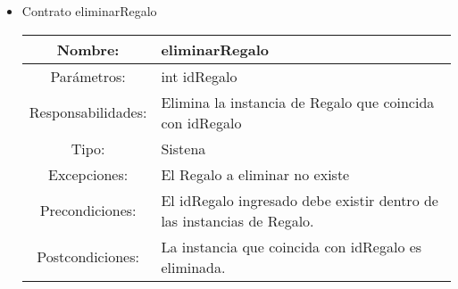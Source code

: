 \begin{itemize}
	\item Contrato eliminarRegalo \\
	\begin{tabular}{|c|p{10cm}|}\hline
		Nombre: & eliminarRegalo\\\hline	
		Par\'ametros: & int idRegalo\\\hline
		Responsabilidades: & Elimina la instancia de Regalo que coincida con idRegalo \\\hline
		Tipo: & Sistena \\\hline
		Excepciones: & El Regalo a eliminar no existe\\\hline
		Precondiciones: & El idRegalo ingresado debe existir dentro de las instancias de Regalo. \\\hline
		Postcondiciones: & La instancia que coincida con idRegalo es eliminada. \\\hline
	\end{tabular}



\end{itemize}
